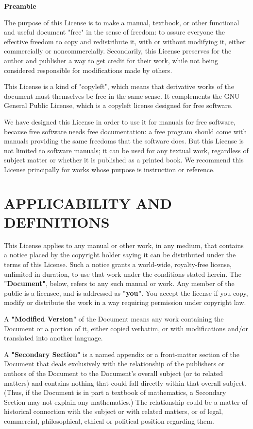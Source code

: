 \documentclass{stacks-project-book}
\theoremstyle{plain}
\theoremstyle{definition}
\theoremstyle{remark}
\numberwithin{equation}{subsection}
\begin{document}
\begin{center}
{\bf\large Preamble}
\end{center}

The purpose of this License is to make a manual, textbook, or other
functional and useful document "free" in the sense of freedom: to
assure everyone the effective freedom to copy and redistribute it,
with or without modifying it, either commercially or noncommercially.
Secondarily, this License preserves for the author and publisher a way
to get credit for their work, while not being considered responsible
for modifications made by others.

This License is a kind of "copyleft", which means that derivative
works of the document must themselves be free in the same sense.  It
complements the GNU General Public License, which is a copyleft
license designed for free software.

We have designed this License in order to use it for manuals for free
software, because free software needs free documentation: a free
program should come with manuals providing the same freedoms that the
software does.  But this License is not limited to software manuals;
it can be used for any textual work, regardless of subject matter or
whether it is published as a printed book.  We recommend this License
principally for works whose purpose is instruction or reference.


\section{APPLICABILITY AND DEFINITIONS}
\label{fdl-section-applicability-and-definitions}

This License applies to any manual or other work, in any medium, that
contains a notice placed by the copyright holder saying it can be
distributed under the terms of this License.  Such a notice grants a
world-wide, royalty-free license, unlimited in duration, to use that
work under the conditions stated herein.  The \textbf{"Document"}, below,
refers to any such manual or work.  Any member of the public is a
licensee, and is addressed as \textbf{"you"}.  You accept the license if you
copy, modify or distribute the work in a way requiring permission
under copyright law.

A \textbf{"Modified Version"} of the Document means any work containing the
Document or a portion of it, either copied verbatim, or with
modifications and/or translated into another language.

A \textbf{"Secondary Section"} is a named appendix or a front-matter section of
the Document that deals exclusively with the relationship of the
publishers or authors of the Document to the Document's overall subject
(or to related matters) and contains nothing that could fall directly
within that overall subject.  (Thus, if the Document is in part a
textbook of mathematics, a Secondary Section may not explain any
mathematics.)  The relationship could be a matter of historical
connection with the subject or with related matters, or of legal,
commercial, philosophical, ethical or political position regarding
them.
\end{document}
